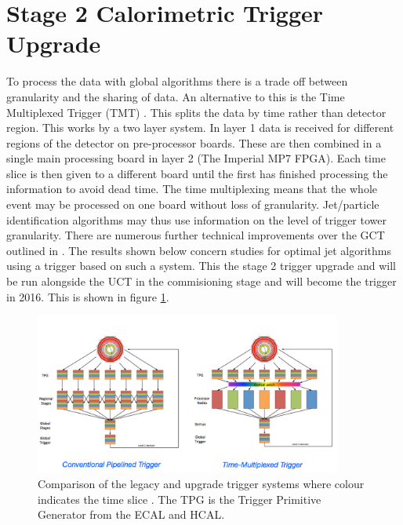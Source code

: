 \section{Stage 2 Calorimetric Trigger Upgrade}
To process the data with global algorithms there is a trade off between granularity and the sharing of data. An alternative to this is the Time Multiplexed Trigger (TMT) \cite{rose}. This splits the data by time rather than detector region. This works by a two layer system. In layer 1 data is received for different regions of the detector on pre-processor boards. These are then combined in a single main processing board in layer 2 (The Imperial MP7 FPGA). Each time slice is then given to a different board until the first has finished processing the information to avoid dead time. The time multiplexing means that the whole event may be processed on one board without loss of granularity. Jet/particle identification algorithms may thus use information on the level of trigger tower granularity. There are numerous further technical improvements over the GCT outlined in \cite{rose}. The results shown below concern studies for optimal jet algorithms using a trigger based on such a system. This the stage 2 trigger upgrade and will be run alongside the UCT in the commisioning stage and will become the trigger in 2016. This is shown in figure \ref{tmux}.
\begin{figure}
\centering
    \includegraphics[width=0.9\textwidth]{./Figures/tmux}
  \caption{Comparison of the legacy and upgrade trigger systems where colour indicates the time slice \cite{JBrooke}. The TPG is the Trigger Primitive Generator from the ECAL and HCAL.}
  \label{tmux}
\end{figure}
